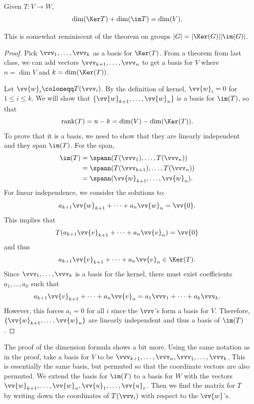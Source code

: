 \begin{theorem}
    Given $T : V \rightarrow W$,
    \[\dim(\Ker T ) + \dim (\im T) = \dim (V). \]
\end{theorem}
This is somewhat reminiscent of the theorem on groups $|G| = \lvert\Ker(G)\rvert \lvert\im(G)\rvert$.
\begin{proof}
    Pick $\vvv_1, \ldots, \vvv_k$ as a basis for $\Ker(T)$. 
    From a theorem from last class, we can add vectors $\vvv_{k+1}, \ldots, \vvv_n$ to get a basis for $V$ where $n = \dim V$ and $k = \dim( \Ker(T))$.

    Let $\vv{w}_i \coloneqq T(\vvv_i)$. By the definition of kernel, $\vv{w}_i = 0$ for $1 \leq i \leq k$. 
    We will show that $\{\vv{w}_{k+1}, \ldots, \vv{w}_n \}$ is a basis for $\im(T)$, so that \[\text{rank}(T) = n-k = \dim(V) - \dim(\Ker(T)). \] 
    To prove that it is a basis, we need to show that they are linearly independent and they span $\im(T)$.
    For the span,
    \begin{align*}
        \im(T) &= \spann(T(\vvv_1), \ldots, T(\vvv_n))\\
               &= \spann(T(\vvv_{k+1}), \ldots, T(\vvv_n)) \\
               &= \spann(\vv{w}_{k+1}, \ldots, \vv{w}_n).
    \end{align*}
    For linear independence, we consider the solutions to: 
    \[ a_{k+1} \vv{w}_{k+1} + \cdots + a_n \vv{w}_n = \vv{0}. \]
    This implies that 
    \[ T(a_{k+1} \vv{v}_{k+1} + \cdots + a_n \vv{v}_n) = \vv{0} \]
    and thus 
    \[ a_{k+1} \vv{v}_{k+1} + \cdots + a_n \vv{v}_n \in \Ker(T) .\]
    Since $\vvv_1, \ldots, \vvv_k$ is a basis for the kernel, there must exist coefficients $a_1, \ldots, a_k$ such that 
    \[ a_{k+1} \vv{v}_{k+1} + \cdots + a_n \vv{v}_n = a_1 \vvv_1 + \cdots + a_k \vvv_k. \]
    However, this forces $a_i = 0$ for all $i$ since the $\vvv$'s form a basis for $V$. 
    Therefore, $\{\vv{w}_{k+1}, \ldots, \vv{w}_n \}$ are linearly independent and thus a basis of $\im(T)$.
\end{proof}
The proof of the dimension formula shows a bit more. 
Using the same notation as in the proof, take a basis for $V$ to be $\vvv_{k+1}, \ldots, \vvv_n, \vvv_1, \ldots, \vvv_k$. This is essentially the same basis, but permuted so that the coordinate vectors are also permuted. 
We extend the basis for $\im(T)$ to a basis for $W$ with the vectors $\vv{w}_{k+1} , \ldots, \vv{w}_n, \vv{u}_1, \ldots, \vv{u}_r$. 
Then we find the matrix for $T$ by writing down the coordinates of $T(\vvv_i)$ with respect to the $\vv{w}$'s. 
